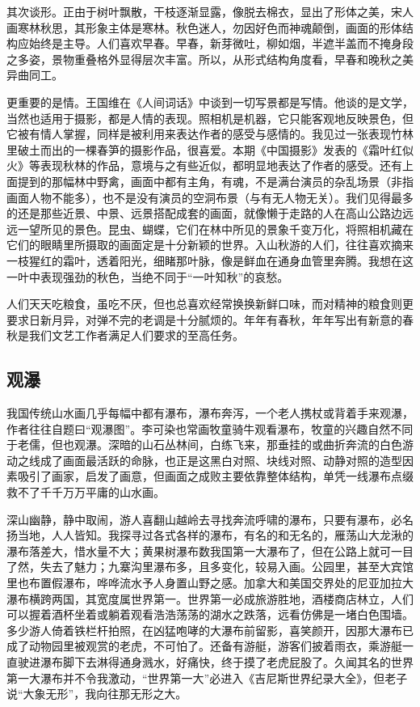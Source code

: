 \documentclass{article}
\begin{document}
其次谈形。正由于树叶飘散，干枝逐渐显露，像脱去棉衣，显出了形体之美，宋人画寒林秋思，其形象主体是寒林。秋色迷人，勿因好色而神魂颠倒，画面的形体结构应始终是主导。人们喜欢早春。早春，新芽微吐，柳如烟，半遮半盖而不掩身段之多姿，景物重叠格外显得层次丰富。所以，从形式结构角度看，早春和晚秋之美异曲同工。

更重要的是情。王国维在《人间词话》中谈到一切写景都是写情。他谈的是文学，当然也适用于摄影，都是人情的表现。照相机是机器，它只能客观地反映景色，但它被有情人掌握，同样是被利用来表达作者的感受与感情的。我见过一张表现竹林里破土而出的一棵春笋的摄影作品，很喜爱。本期《中国摄影》发表的《霜叶红似火》等表现秋林的作品，意境与之有些近似，都明显地表达了作者的感受。还有上面提到的那幅林中野禽，画面中都有主角，有魂，不是满台演员的杂乱场景（非指画面人物不能多），也不是没有演员的空洞布景（与有无人物无关）。我们见得最多的还是那些近景、中景、远景搭配成套的画面，就像懒于走路的人在高山公路边远远一望所见的景色。昆虫、蝴蝶，它们在林中所见的景象千变万化，将照相机藏在它们的眼睛里所摄取的画面定是十分新颖的世界。入山秋游的人们，往往喜欢摘来一枝猩红的霜叶，透着阳光，细睹那叶脉，像是鲜血在通身血管里奔腾。我想在这一叶中表现强劲的秋色，当绝不同于“一叶知秋”的哀愁。

人们天天吃粮食，虽吃不厌，但也总喜欢经常换换新鲜口味，而对精神的粮食则更要求日新月异，对弹不完的老调是十分腻烦的。年年有春秋，年年写出有新意的春秋是我们文艺工作者满足人们要求的至高任务。
\subsection{观瀑}
我国传统山水画几乎每幅中都有瀑布，瀑布奔泻，一个老人携杖或背着手来观瀑，作者往往自题曰“观瀑图”。李可染也常画牧童骑牛观看瀑布，牧童的兴趣自然不同于老儒，但也观瀑。深暗的山石丛林间，白练飞来，那垂挂的或曲折奔流的白色游动之线成了画面最活跃的命脉，也正是这黑白对照、块线对照、动静对照的造型因素吸引了画家，启发了画意，但画面之成败主要依靠整体结构，单凭一线瀑布点缀救不了千千万万平庸的山水画。

深山幽静，静中取闹，游人喜翻山越岭去寻找奔流呼啸的瀑布，只要有瀑布，必名扬当地，人人皆知。我探寻过各式各样的瀑布，有名的和无名的，雁荡山大龙湫的瀑布落差大，惜水量不大；黄果树瀑布数我国第一大瀑布了，但在公路上就可一目了然，失去了魅力；九寨沟里瀑布多，且多变化，较易入画。公园里，甚至大宾馆里也布置假瀑布，哗哗流水予人身置山野之感。加拿大和美国交界处的尼亚加拉大瀑布横跨两国，其宽度属世界第一。世界第一必成旅游胜地，酒楼商店林立，人们可以握着酒杯坐着或躺着观看浩浩荡荡的湖水之跌落，远看仿佛是一堵白色围墙。多少游人倚着铁栏杆拍照，在凶猛咆哮的大瀑布前留影，喜笑颜开，因那大瀑布已成了动物园里被观赏的老虎，不可怕了。还备有游艇，游客们披着雨衣，乘游艇一直驶进瀑布脚下去淋得通身溅水，好痛快，终于摸了老虎屁股了。久闻其名的世界第一大瀑布并不令我激动，“世界第一大”必进入《吉尼斯世界纪录大全》，但老子说“大象无形”，我向往那无形之大。
\end{document}
